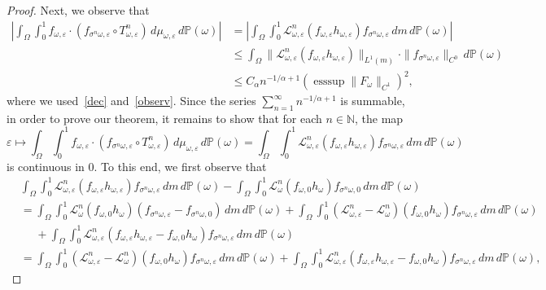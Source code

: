 \documentclass[12pt,reqno,a4paper]{article}
\DeclareMathOperator{\esssup}{esssup}
\begin{document}
\begin{proof}
		Next, we observe  that 
		\[
		\begin{split}
			\left |\int_\Omega \int_0^1 f_{\omega, \varepsilon}\cdot (f_{\sigma^n \omega, \varepsilon}\circ T_{\omega, \varepsilon}^n)\, d\mu_{\omega, \varepsilon}\, d\mathbb P(\omega) \right |  &=\left | \int_\Omega\int_0^1 \mathcal L_{\omega, \varepsilon}^n(f_{\omega, \varepsilon}h_{\omega, \varepsilon})f_{\sigma^n \omega, \varepsilon}\, dm\, d\mathbb P(\omega) \right | \\
			&\le \int_\Omega \|\mathcal L_{\omega, \varepsilon}^n(f_{\omega, \varepsilon}h_{\omega, \varepsilon})\|_{L^1(m)}\cdot \|f_{\sigma^n \omega, \varepsilon}\|_{C^0}\, d\mathbb P(\omega) \\
			&\le C_\alpha n^{-1/\alpha+1}\left (\esssup\|F_\omega \|_{C^1} \right )^2,
		\end{split}
		\]
		where we used~\eqref{dec} and~\eqref{observ}. Since the series $\sum_{n=1}^\infty n^{-1/\alpha+1}$ is summable, in order to prove our theorem, it remains to show that for each $n\in \mathbb N$, the map 
		\[
		\varepsilon \mapsto  \int_\Omega \int_0^1 f_{\omega, \varepsilon}\cdot (f_{\sigma^n \omega, \varepsilon}\circ T_{\omega, \varepsilon}^n)\, d\mu_{\omega, \varepsilon}\, d\mathbb P(\omega)=\int_\Omega\int_0^1 \mathcal L_{\omega, \varepsilon}^n(f_{\omega, \varepsilon}h_{\omega, \varepsilon})f_{\sigma^n \omega, \varepsilon}\, dm\, d\mathbb P(\omega)
		\]
		is continuous in $0$. To this end, we first observe that 
		\[
		\begin{split}
			&\int_\Omega\int_0^1 \mathcal L_{\omega, \varepsilon}^n(f_{\omega, \varepsilon}h_{\omega, \varepsilon})f_{\sigma^n \omega, \varepsilon}\, dm\, d\mathbb P(\omega)-\int_\Omega\int_0^1 \mathcal L_{\omega}^n(f_{\omega, 0}h_{\omega})f_{\sigma^n \omega, 0}\, dm\, d\mathbb P(\omega)\\
			&=\int_\Omega \int_0^1 \mathcal L_\omega^n(f_{\omega, 0}h_\omega)(f_{\sigma^n \omega, \varepsilon}-f_{\sigma^n \omega, 0})\, dm\, d\mathbb P(\omega)+\int_\Omega \int_0^1 (\mathcal L_{\omega, \varepsilon}^n-\mathcal L_\omega^n)(f_{\omega, 0}h_\omega) f_{\sigma^n \omega, \varepsilon}\, dm\, d\mathbb P(\omega)\\
			&\phantom{=}+\int_\Omega \int_0^1 \mathcal L_{\omega, \varepsilon}^n(f_{\omega, \varepsilon}h_{\omega, \varepsilon}-f_{\omega, 0}h_\omega) f_{\sigma^n \omega, \varepsilon}\, dm\, d\mathbb P(\omega) \\
			&=\int_\Omega \int_0^1 (\mathcal L_{\omega, \varepsilon}^n-\mathcal L_\omega^n)(f_{\omega, 0}h_\omega) f_{\sigma^n \omega, \varepsilon}\, dm\, d\mathbb P(\omega)+\int_\Omega \int_0^1 \mathcal L_{\omega, \varepsilon}^n(f_{\omega, \varepsilon}h_{\omega, \varepsilon}-f_{\omega, 0}h_\omega) f_{\sigma^n \omega, \varepsilon}\, dm\, d\mathbb P(\omega),

\end{split}\]
\end{proof}
\end{document}
